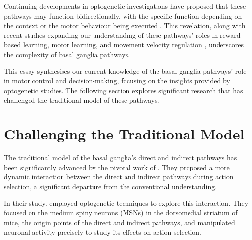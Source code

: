 \documentclass[10pt]{article}
\begin{document}
\begin{sloppypar}
  Continuing developments in optogenetic investigations have proposed that these pathways may function bidirectionally, with the specific function depending on the context or the motor behaviour being executed \citep{yttri_opponent_2016}. This revelation, along with recent studies expanding our understanding of these pathways’ roles in reward-based learning, motor learning, and movement velocity regulation \citep{hilt_evidence_2016, wang_direct_2015}, underscores the complexity of basal ganglia pathways.

  This essay synthesises our current knowledge of the basal ganglia pathways’ role in motor control and decision-making, focusing on the insights provided by optogenetic studies. The following section explores significant research that has challenged the traditional model of these pathways.

  \section{Challenging the Traditional Model}
  \label{sec:challenging-the-traditional-model}

  The traditional model of the basal ganglia’s direct and indirect pathways has been significantly advanced by the pivotal work of \cite{cui_concurrent_2013}. They proposed a more dynamic interaction between the direct and indirect pathways during action selection, a significant departure from the conventional understanding.

  In their study, \cite{cui_concurrent_2013} employed optogenetic techniques to explore this interaction. They focused on the medium spiny neurons (MSNs) in the dorsomedial striatum of mice, the origin points of the direct and indirect pathways, and manipulated neuronal activity precisely to study its effects on action selection.


\end{sloppypar}
\end{document}
